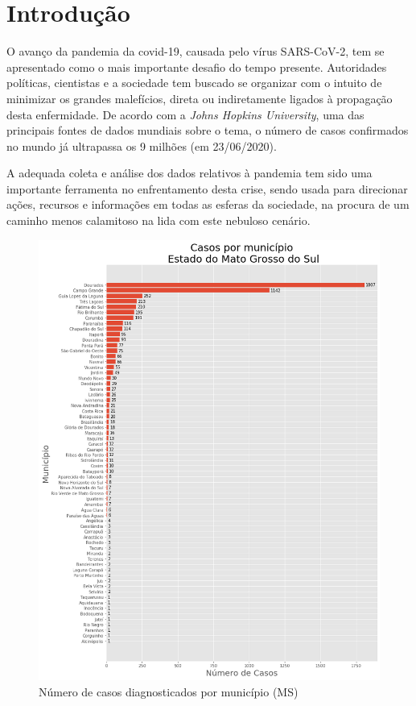 \documentclass[12pt]{article}
\begin{document}
\section{Introdução}

O avanço da pandemia da covid-19, causada pelo vírus SARS-CoV-2, tem se apresentado como o mais importante desafio do tempo presente. Autoridades políticas, cientistas e a sociedade tem buscado se organizar com o intuito de minimizar os grandes malefícios, direta ou indiretamente ligados à propagação desta enfermidade. De acordo com a \textit{Johns Hopkins University}, uma das principais fontes de dados mundiais sobre o tema, o número de casos confirmados no mundo já ultrapassa os 9 milhões (em 23/06/2020).

A adequada coleta e análise dos dados relativos à pandemia tem sido uma importante ferramenta no enfrentamento desta crise, sendo usada para direcionar ações, recursos e informações em todas as esferas da sociedade, na procura de um caminho menos calamitoso na lida com este nebuloso cenário.

\begin{figure}[!htb]
  \centering
  \includegraphics[width=1\textwidth]{figs/casos_por_municipio.png}
  \caption{Número de casos diagnosticados por município (MS)}
  \label{fig:casosMuni}
  \end{figure}
\end{document}
